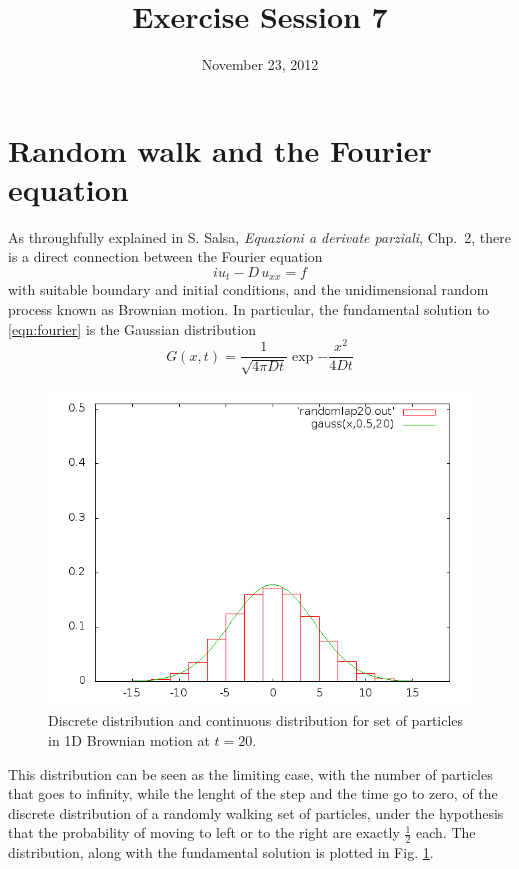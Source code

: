 \documentclass[10pt,a4paper]{article}
\title{Exercise Session 7}
\date{November 23, 2012}
\begin{document}
\lstset{language=[ISO]C++}
\maketitle

\section*{Random walk and the Fourier equation}

As throughfully explained in S. Salsa, \emph{Equazioni a derivate parziali},
Chp.~2, there is a direct connection between the Fourier equation
\begin{equation}i
\label{eqn:fourier}
u_t - D \, u_{xx} = f
\end{equation}
with suitable boundary and initial conditions, and the unidimensional random
process known as Brownian motion. In particular, the fundamental solution to
\eqref{eqn:fourier} is the Gaussian distribution
\[
G(x,t) = \frac{1}{\sqrt{ 4 \pi D t}} \exp{-\frac{x^2}{4 D t}}
\]
%
\begin{figure}
\centering
\includegraphics[width=.6\textwidth]{fig/randomlap20}
\caption{Discrete distribution and continuous distribution for set of particles
         in 1D Brownian motion at $t = 20$.}
\label{fig:distr}
\end{figure}
%
This distribution can be seen as the limiting case, with the number of particles
that goes to infinity, while the lenght of the step and the time go to zero, of
the discrete distribution of a randomly walking set of particles, under the
hypothesis that the probability of moving to left or to the right are exactly
$\frac{1}{2}$ each. The distribution, along with the fundamental solution is
plotted in Fig. \ref{fig:distr}.




%
\end{document}
